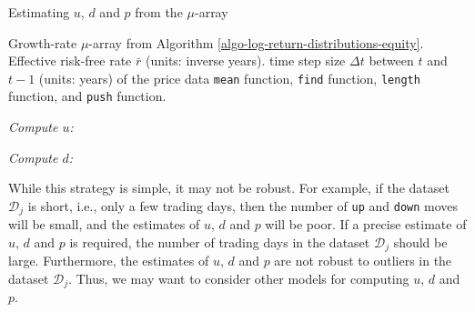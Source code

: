 \documentclass[11pt]{article}
\theoremstyle{definition}
\begin{document}
\begin{algorithm}[h]
	\caption{Estimating $u$, $d$ and $p$ from the $\mu$-array}\label{algo-ud-estimation-equity}
	\begin{algorithmic}[1]

		\Require Growth-rate $\mu$-array from Algorithm \ref{algo-log-return-distributions-equity}.
		\Require Effective risk-free rate $\bar{r}$ (units: inverse years).
		\Require time step size $\Delta{t}$ between $t$ and $t-1$ (units: years) of the price data
		\Require \texttt{mean} function, \texttt{find} function, \texttt{length} function, and \texttt{push} function.

		\Statex
		\State
		
		\Statex
		\State \textit{Compute $u$:}
    	\EndFor
    	
		\Statex
		\State \textit{Compute $d$:}
    	\EndFor



		\Statex
		\Statex

		\State
		\Statex
		\EndProcedure
	\end{algorithmic}
\end{algorithm}
While this strategy is simple, it may not be robust. For example, if the dataset $\mathcal{D}_{j}$ is short, i.e., only a few trading days,
then the number of \texttt{up} and \texttt{down} moves will be small, and the estimates of $u$, $d$ and $p$ will be poor.
If a precise estimate of $u$, $d$ and $p$ is required, the number of trading days in the dataset $\mathcal{D}_{j}$ should be large.
Furthermore, the estimates of $u$, $d$ and $p$ are not robust to outliers in the dataset $\mathcal{D}_{j}$.
Thus, we may want to consider other models for computing $u$, $d$ and $p$.
\end{document}
